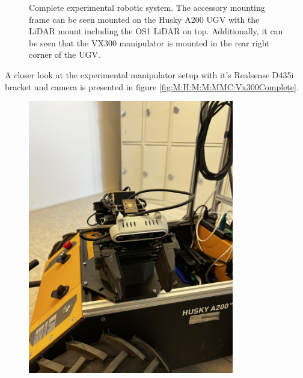 \begin{figure}[H]
\begin{minipage}[b]{0.49\textwidth}
    \caption{Complete experimental robotic system. The accessory mounting frame can be seen mounted on the Husky A200 UGV with the LiDAR mount including the OS1 LiDAR on top. Additionally, it can be seen that the VX300 manipulator is mounted in the rear right corner of the UGV.}
    \label{fig:M:H:CHS:PhysHuskyComplete}
  \end{minipage}
\end{figure}

A closer look at the experimental manipulator setup with it's Realsense D435i bracket and camera is presented in figure \ref{fig:M:H:M:M:MMC:Vx300Complete}.

\begin{figure}[H]
  \centering
  \begin{minipage}[b]{0.49\textwidth}
        \centering
        \includegraphics[angle=-90,width = 0.8\textwidth]{Figures/figVX300PhysComplete1.jpg}
  \end{minipage}
  \hfill
  \begin{minipage}[b]{0.49\textwidth}
    \centering

\end{minipage}
\end{figure}
